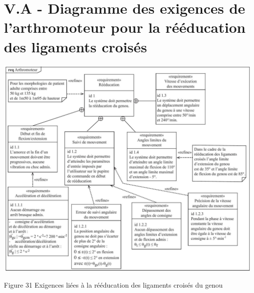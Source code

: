 \documentclass[10pt]{article}
\begin{document}
\section*{V.A - Diagramme des exigences de l'arthromoteur pour la rééducation des ligaments croisés}
\begin{center}
\includegraphics[max width=\textwidth]{2024_07_14_a83aebba33898893d39fg-19}
\end{center}

Figure 31 Exigences liées à la rééducation des ligaments croisés du genou
\end{document}
